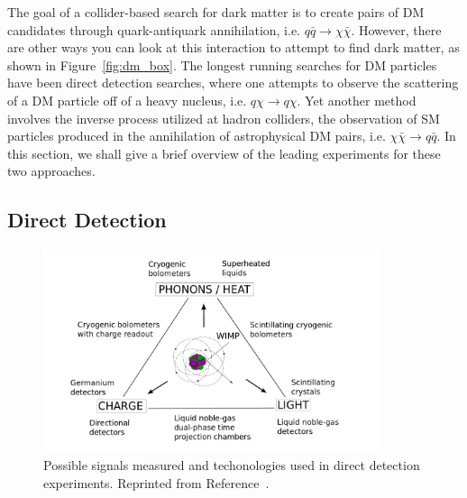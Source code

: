 The goal of a collider-based search for dark matter is to create pairs of DM candidates through quark-antiquark annihilation, i.e. $q\bar q \rightarrow \chi\bar\chi$.
However, there are other ways you can look at this interaction to attempt to find dark matter, as shown in Figure~\ref{fig:dm_box}.
The longest running searches for DM particles have been direct detection searches, where one attempts to observe the scattering of a DM particle off of a heavy nucleus, i.e. $q \chi \rightarrow q \chi$.
Yet another method involves the inverse process utilized at hadron colliders, the observation of SM particles produced in the annihilation of astrophysical DM pairs, i.e. $\chi\bar\chi \rightarrow q \bar q$.
In this section, we shall give a brief overview of the leading experiments for these two approaches.

\subsection{Direct Detection}
\label{sec:dm_direct}

\begin{figure}[htbp]
  \centering
  \includegraphics[width=0.875\textwidth]{DarkMatter/Figures/direct_triangle.png}
  \caption{
    Possible signals measured and techonologies used in direct detection experiments.
    Reprinted from Reference~\cite{}. %
  }
  \label{fig:direct_triangle}
\end{figure}

